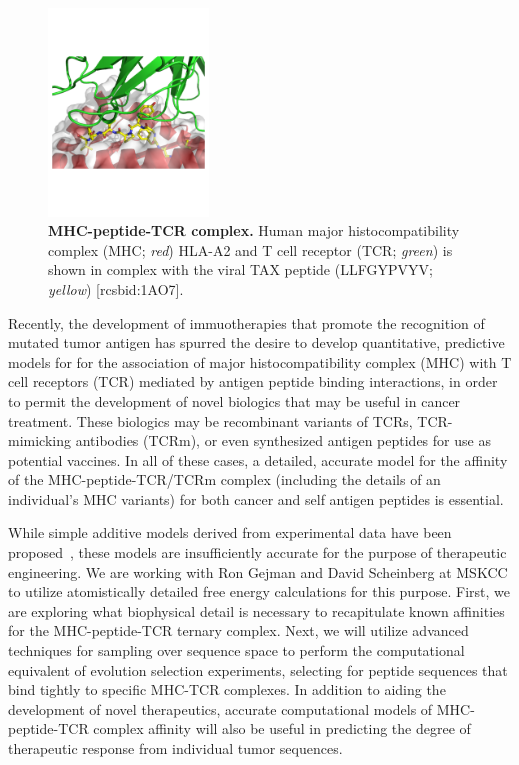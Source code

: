 \documentclass[10pt]{article}
\begin{document}
\begin{figure}
\vspace{-2cm}
\includegraphics[width=0.38\textwidth]{figures/1AO7.pdf}
\vspace{-2cm}
\caption{\footnotesize \label{fig:mhc-peptide-tcr} {\bf MHC-peptide-TCR complex.}
Human major histocompatibility complex (MHC; \emph{red}) HLA-A2 and T cell receptor (TCR; \emph{green}) is shown in complex with the viral TAX peptide (LLFGYPVYV; \emph{yellow}) [rcsbid:1AO7].}
\end{figure}

Recently, the development of immuotherapies that promote the recognition of mutated tumor antigen has spurred the desire to develop quantitative, predictive models for for the association of major histocompatibility complex (MHC) with T cell receptors (TCR) mediated by antigen peptide binding interactions, in order to permit the development of novel biologics that may be useful in cancer treatment.
These biologics may be recombinant variants of TCRs, TCR-mimicking antibodies (TCRm), or even synthesized antigen peptides for use as potential vaccines.
In all of these cases, a detailed, accurate model for the affinity of the MHC-peptide-TCR/TCRm complex (including the details of an individual's MHC variants) for both cancer and self antigen peptides is essential.

While simple additive models derived from experimental data have been proposed~\cite{antigen-affinity-models}, these models are insufficiently accurate for the purpose of therapeutic engineering.
We are working with Ron Gejman and David Scheinberg at MSKCC to utilize atomistically detailed free energy calculations for this purpose.
First, we are exploring what biophysical detail is necessary to recapitulate known affinities for the MHC-peptide-TCR ternary complex.
Next, we will utilize advanced techniques for sampling over sequence space to perform the computational equivalent of evolution selection experiments, selecting for peptide sequences that bind tightly to specific MHC-TCR complexes.
In addition to aiding the development of novel therapeutics, accurate computational models of MHC-peptide-TCR complex affinity will also be useful in predicting the degree of therapeutic response from individual tumor sequences.
\end{document}
